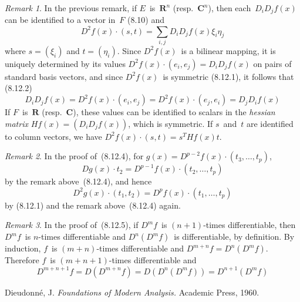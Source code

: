 \documentclass[letterpaper,12pt]{article}
\newcommand{\R}{\mathbf{R}}
\newcommand{\C}{\mathbf{C}}
\newcommand{\at}{\cdot}
\theoremstyle{plain}
\theoremstyle{definition}
\theoremstyle{remark}
\newtheorem*{rmk}{Remark}
\begin{document}
\begin{rmk}
In the previous remark, if \(E\)~is~\(\R^n\) (resp.~\(\C^n\)), then each~\(D_iD_jf(x)\) can be identified to a vector in~\(F\) (8.10) and
\[D^2f(x)\at(s,t)=\sum_{i,j}D_iD_jf(x)\xi_i\eta_j\]
where \(s=(\xi_i)\) and \(t=(\eta_i)\). Since \(D^2f(x)\)~is a bilinear mapping, it is uniquely determined by its values \(D^2f(x)\at(e_i,e_j)=D_iD_jf(x)\) on pairs of standard basis vectors, and since \(D^2f(x)\)~is symmetric (8.12.1), it follows that (8.12.2)
\[D_iD_jf(x)=D^2f(x)\at(e_i,e_j)=D^2f(x)\at(e_j,e_i)=D_jD_if(x)\]
If \(F\)~is~\(\R\) (resp.~\(\C\)), these values can be identified to scalars in the \emph{hessian matrix} \(Hf(x)=(D_iD_jf(x))\), which is symmetric. If \(s\)~and~\(t\) are identified to column vectors, we have \(D^2f(x)\at(s,t)=s^T Hf(x) t\).
\end{rmk}

\begin{rmk}
In the proof of~(8.12.4), for \(g(x)=D^{p-2}f(x)\at(t_3,\ldots,t_p)\),
\[Dg(x)\at t_2=D^{p-1}f(x)\at(t_2,\ldots,t_p)\]
by the remark above~(8.12.4), and hence
\[D^2g(x)\at(t_1,t_2)=D^pf(x)\at(t_1,\ldots,t_p)\]
by (8.12.1) and the remark above~(8.12.4) again.
\end{rmk}

\begin{rmk}
In the proof of~(8.12.5), if \(D^mf\)~is \((n+1)\)-times differentiable, then \(D^mf\)~is \(n\)-times differentiable and \(D^n(D^m f)\)~is differentiable, by definition. By induction, \(f\)~is \((m+n)\)-times differentiable and \(D^{m+n}f=D^n(D^mf)\). Therefore \(f\)~is \((m+n+1)\)-times differentiable and
\[D^{m+n+1}f=D(D^{m+n}f)=D(D^n(D^mf))=D^{n+1}(D^mf)\]
\end{rmk}

\begin{thebibliography}{0}
 Dieudonn\'e, J. \textit{Foundations of Modern Analysis.} Academic Press, 1960.
\end{thebibliography}
\end{document}
